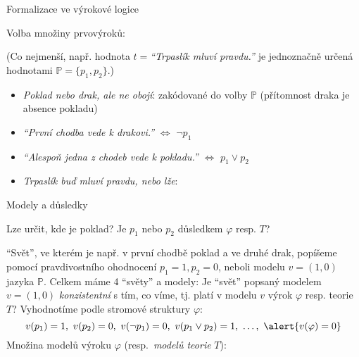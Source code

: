 \documentclass{beamer}
\begin{document}
\begin{frame}{Formalizace ve výrokové logice}

    Volba množiny prvovýroků: 
    
    \vspace{-12pt}

    (Co nejmenší, např. hodnota $t=${\it ``Trpaslík mluví pravdu.''} je jednoznačně určená hodnotami $\mathbb P=\{p_1,p_2\}$.)
    \begin{itemize}
        \item {\it Poklad nebo drak, ale ne obojí}: zakódované do volby $\mathbb P$ (přítomnost draka je absence pokladu)
        \item {\it ``První chodba vede k drakovi.''} $\Leftrightarrow$ \alert{$\neg p_1$}
        \item {\it ``Alespoň jedna z chodeb vede k pokladu.''} $\Leftrightarrow$ \alert{$p_1 \lor p_2$}
        \item {\it Trpaslík buď mluví pravdu, nebo lže}:
    \end{itemize}

    \medskip

\end{frame}


\begin{frame}{Modely a důsledky}

    Lze určit, kde je poklad? Je $p_1$ nebo $p_2$ \alert{důsledkem} $\varphi$ resp. $T$?    

    \alert{``Svět''}, ve kterém je např. v první chodbě poklad a ve druhé drak, popíšeme pomocí \alert{pravdivostního ohodnocení} $p_1=1,p_2=0$, neboli \alert{modelu} $v=(1,0)$ jazyka $\mathbb P$. Celkem máme 4 ``světy'' a modely:
    Je ``svět'' popsaný modelem $v = (1,0)$ \emph{konzistentní} s tím, co víme, tj. \alert{platí} v modelu $v$ výrok $\varphi$ resp. teorie $T$? Vyhodnotíme podle stromové struktury $\varphi$:
    $$
    v(p_1) = 1,\ v(p_2) = 0,\ v(\neg p_1) = 0,\ v(p_1 \lor p_2)=1,\ \dots,\ \alert{v(\varphi)=0}
    $$
    Množina \alert{modelů výroku} \( \varphi \) (resp.\ \emph{modelů teorie} \( T \)):

    \vspace{-12pt}
    
\end{frame}
\end{document}
